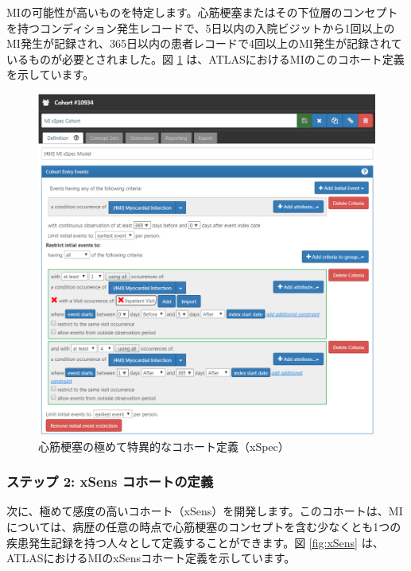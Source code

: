 \documentclass[
  11pt]{book}
\theoremstyle{definition}
\theoremstyle{definition}
\theoremstyle{definition}
\theoremstyle{definition}
\theoremstyle{remark}
\begin{document}
MIの可能性が高いものを特定します。心筋梗塞またはその下位層のコンセプトを持つコンディション発生レコードで、5日以内の入院ビジットから1回以上のMI発生が記録され、365日以内の患者レコードで4回以上のMI発生が記録されているものが必要とされました。図 \ref{fig:xSpec} は、ATLASにおけるMIのこのコホート定義を示しています。

\begin{figure}

{\centering \includegraphics[width=1\linewidth]{images/ClinicalValidity/xSpec} 

}

\caption{心筋梗塞の極めて特異的なコホート定義（xSpec）}\label{fig:xSpec}
\end{figure}

\subsubsection*{ステップ 2: xSens コホートの定義}\label{ux30b9ux30c6ux30c3ux30d7-2-xsens-ux30b3ux30dbux30fcux30c8ux306eux5b9aux7fa9}

次に、極めて感度の高いコホート（xSens）を開発します。このコホートは、MIについては、病歴の任意の時点で心筋梗塞のコンセプトを含む少なくとも1つの疾患発生記録を持つ人々として定義することができます。図 \ref{fig:xSens} は、ATLASにおけるMIのxSensコホート定義を示しています。
\end{document}
